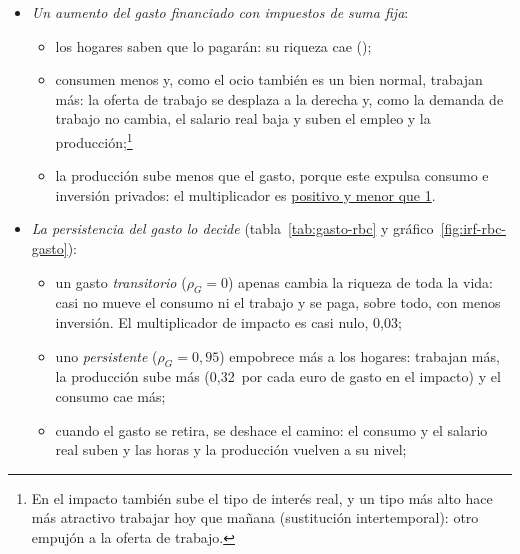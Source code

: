 \documentclass[11pt]{article}
\begin{document}
\begin{itemize}
\begin{itemize}
  \end{itemize}
  Los ajustes basados en recortes de gasto cuestan mucha menos producción que los basados en subidas de impuestos\nocite{AlesinaArdagna2010Large,AlesinaFaveroGiavazzi2019Austerity}; pero, identificadas las consolidaciones en los documentos presupuestarios, la mayoría reduce la actividad a corto plazo\nocite{GuajardoLeighPescatori2014}.\footnote{Sobre la obra de  (1957-2020) y el debate sobre la austeridad expansiva, \href{https://www.economist.com/finance-and-economics/2020/05/28/the-legacy-of-alberto-alesina}{«The legacy of Alberto Alesina»} (\emph{The Economist}, 28~de mayo de 2020).}

\item \emph{Un aumento del gasto financiado con impuestos de suma fija}\nocite{BaxterKing1993Fiscal}:
  \begin{itemize}
  \item los hogares saben que lo pagarán: su riqueza cae ();
  \item consumen menos y, como el ocio también es un bien normal, trabajan más: la oferta de trabajo se desplaza a la derecha y, como la demanda de trabajo no cambia, el salario real baja y suben el empleo y la producción;\footnote{En el impacto también sube el tipo de interés real, y un tipo más alto hace más atractivo trabajar hoy que mañana (sustitución intertemporal): otro empujón a la oferta de trabajo\nocite{Romer2019Advanced}.}
  \item la producción sube menos que el gasto, porque este expulsa consumo e inversión privados: el multiplicador es \uline{positivo y menor que 1}.
  \end{itemize}
\item \emph{La persistencia del gasto lo decide} (tabla~\ref{tab:gasto-rbc} y gráfico~\ref{fig:irf-rbc-gasto}):
  \begin{itemize}
  \item un gasto \emph{transitorio} ($\rho_G=0$) apenas cambia la riqueza de toda la vida: casi no mueve el consumo ni el trabajo y se paga, sobre todo, con menos inversión. El multiplicador de impacto es casi nulo, 0,03;
  \item uno \emph{persistente} ($\rho_G=0{,}95$) empobrece más a los hogares: trabajan más, la producción sube más (0,32~por cada euro de gasto en el impacto) y el consumo cae más;
  \item cuando el gasto se retira, se deshace el camino: el consumo y el salario real suben y las horas y la producción vuelven a su nivel;

\end{itemize}
\end{itemize}
\end{document}
